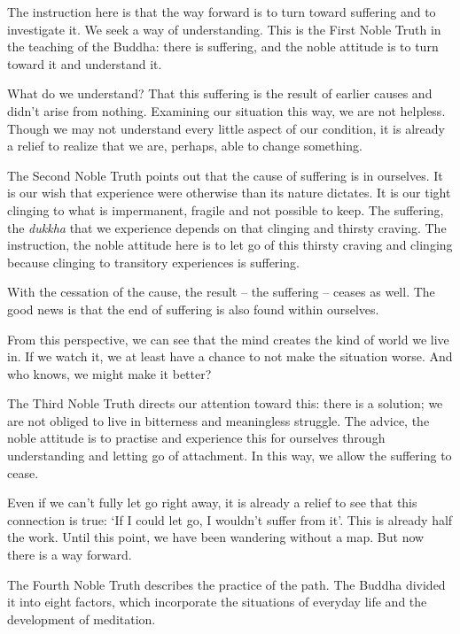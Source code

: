 The instruction here is that the way forward is to turn toward suffering
and to investigate it. We seek a way of understanding. This is the First
Noble Truth in the teaching of the Buddha: there is suffering, and the
noble attitude is to turn toward it and understand it.

What do we understand? That this suffering is the result of earlier
causes and didn't arise from nothing. Examining our situation this way,
we are not helpless. Though we may not understand every little aspect of
our condition, it is already a relief to realize that we are, perhaps,
able to change something.


The Second Noble Truth points out that the cause of suffering is in
ourselves. It is our wish that experience were otherwise than its nature
dictates. It is our tight clinging to what is impermanent, fragile and
not possible to keep. The suffering, the \emph{dukkha} that we
experience depends on that clinging and thirsty craving. The
instruction, the noble attitude here is to let go of this thirsty
craving and clinging because clinging to transitory experiences is
suffering.


With the cessation of the cause, the result -- the suffering -- ceases
as well. The good news is that the end of suffering is also found within
ourselves.

From this perspective, we can see that the mind creates the kind of
world we live in. If we watch it, we at least have a chance to not make
the situation worse. And who knows, we might make it better?

The Third Noble Truth directs our attention toward this: there is a
solution; we are not obliged to live in bitterness and meaningless
struggle. The advice, the noble attitude is to practise and experience
this for ourselves through understanding and letting go of attachment.
In this way, we allow the suffering to cease.

Even if we can't fully let go right away, it is already a relief to see
that this connection is true: `If I could let go, I wouldn't suffer from
it'. This is already half the work. Until this point, we have been
wandering without a map. But now there is a way forward.


The Fourth Noble Truth describes the practice of the path. The Buddha
divided it into eight factors, which incorporate the situations of
everyday life and the development of meditation.

